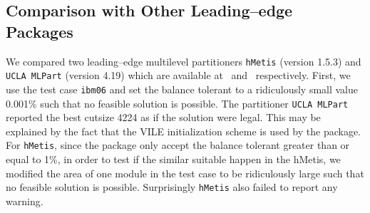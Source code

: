 \documentclass[journal]{IEEEtran}
\begin{document}
\subsection{Comparison with Other Leading--edge Packages}
We compared two leading--edge multilevel partitioners \verb+hMetis+
(version 1.5.3) and \verb+UCLA MLPart+ (version 4.19) which are
available at~\cite{hMetis} and~\cite{ucla_pdtools} respectively.
First, we use the test case \verb+ibm06+ and set the balance tolerant
to a ridiculously small value 0.001\% such that no feasible solution is
possible. The partitioner \verb+UCLA MLPart+ reported the best
cutsize 4224 as if the solution were legal. This may be explained by
the fact that the VILE initialization scheme is used by the
package. For \verb+hMetis+, since the package only accept the balance
tolerant greater than or equal to 1\%, in order to test if the similar
suitable happen in the hMetis, we modified the area of one module in
the test case to be ridiculously large such that no feasible solution
is possible. Surprisingly \verb+hMetis+ also failed to report any
warning.
\end{document}
